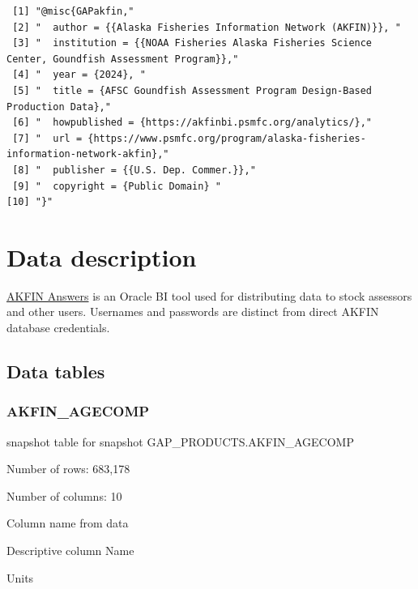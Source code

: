 \documentclass[
  letterpaper,
  oneside,
  open=any]{scrbook}
\begin{document}
\begin{verbatim}
 [1] "@misc{GAPakfin,"                                                                                  
 [2] "  author = {{Alaska Fisheries Information Network (AKFIN)}}, "                                    
 [3] "  institution = {{NOAA Fisheries Alaska Fisheries Science Center, Goundfish Assessment Program}},"
 [4] "  year = {2024}, "                                                                                
 [5] "  title = {AFSC Goundfish Assessment Program Design-Based Production Data},"                      
 [6] "  howpublished = {https://akfinbi.psmfc.org/analytics/},"                                         
 [7] "  url = {https://www.psmfc.org/program/alaska-fisheries-information-network-akfin},"              
 [8] "  publisher = {{U.S. Dep. Commer.}},"                                                             
 [9] "  copyright = {Public Domain} "                                                                   
[10] "}"                                                                                                
\end{verbatim}

\chapter{Data description}\label{data-description-2}

\href{https://akfin.psmfc.org/akfin-answers/}{AKFIN Answers} is an
Oracle BI tool used for distributing data to stock assessors and other
users. Usernames and passwords are distinct from direct AKFIN database
credentials.

\section{Data tables}\label{data-tables-1}

\subsection{AKFIN\_AGECOMP}\label{akfin_agecomp}

snapshot table for snapshot GAP\_PRODUCTS.AKFIN\_AGECOMP

Number of rows: 683,178

Number of columns: 10

Column name from data

Descriptive column Name

Units
\end{document}
